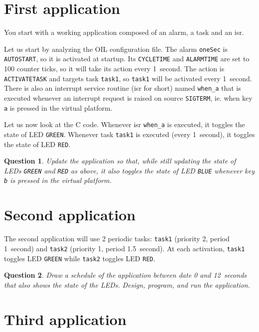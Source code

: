 \documentclass[11pt]{report}
\newtheorem{ex}{Question}
\begin{document}
\section{First application}

You start with a working application composed of an alarm, a task and an isr.

Let us start by analyzing the OIL configuration file.
The alarm \verb-oneSec- is \verb-AUTOSTART-, so it is activated at startup.
Its \verb-CYCLETIME- and \verb-ALARMTIME- are set to \num{100} counter ticks, so it will take its action every \SI{1}{second}.
The action is \verb-ACTIVATETASK- and targets task \verb-task1-, so \verb-task1- will be activated every \SI{1}{second}.
There is also an interrupt service routine (isr for short) named \verb-when_a- that is executed whenever an interrupt request is raised on source \verb-SIGTERM-, ie. when key \verb-a- is pressed in the virtual platform.

Let us now look at the C code.
Whenever isr \verb-when_a- is executed, it toggles the state of LED \verb-GREEN-.
Whenever task \verb-task1- is executed (every \SI{1}{second}), it toggles the state of LED \verb-RED-.

\begin{ex}
  Update the application so that, while still updating the state of LEDs \verb-GREEN- and \verb-RED- as above, it also toggles the state of LED \verb-BLUE- whenever key \verb-b- is pressed in the virtual platform.
\end{ex}

\section{Second application}

The second application will use 2 periodic tasks: \texttt{task1} (priority 2, period \SI{1}{second}) and \texttt{task2} (priority 1, period \SI{1.5}{second}).
At each activation, \texttt{task1} toggles LED \verb-GREEN- while \texttt{task2} toggles LED \verb-RED-.

\begin{ex}
  Draw a schedule of the application between date \num{0} and \SI{12}{seconds} that also shows the state of the LEDs.
  Design, program, and run the application.
\end{ex}


\section{Third application}
\end{document}
